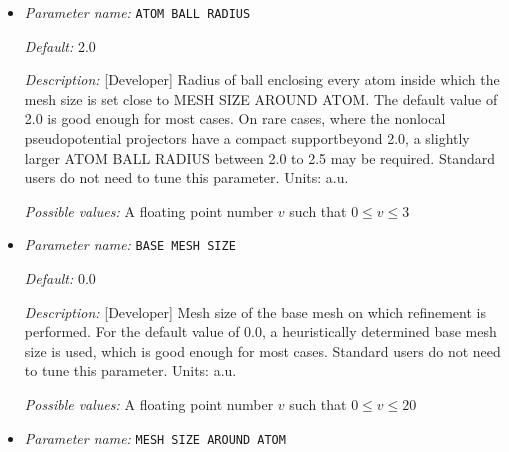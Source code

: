 \begin{itemize}
\item {\it Parameter name:} {\tt ATOM BALL RADIUS}
\label{parameters:Finite element mesh parameters/Auto mesh generation parameters/ATOM BALL RADIUS}
\label{parameters:Finite_20element_20mesh_20parameters/Auto_20mesh_20generation_20parameters/ATOM_20BALL_20RADIUS}




{\it Default:} 2.0


{\it Description:} [Developer] Radius of ball enclosing every atom inside which the mesh size is set close to MESH SIZE AROUND ATOM. The default value of 2.0 is good enough for most cases. On rare cases, where the nonlocal pseudopotential projectors have a compact supportbeyond 2.0, a slightly larger ATOM BALL RADIUS between 2.0 to 2.5 may be required. Standard users do not need to tune this parameter. Units: a.u.


{\it Possible values:} A floating point number $v$ such that $0 \leq v \leq 3$
\item {\it Parameter name:} {\tt BASE MESH SIZE}
\label{parameters:Finite element mesh parameters/Auto mesh generation parameters/BASE MESH SIZE}
\label{parameters:Finite_20element_20mesh_20parameters/Auto_20mesh_20generation_20parameters/BASE_20MESH_20SIZE}




{\it Default:} 0.0


{\it Description:} [Developer] Mesh size of the base mesh on which refinement is performed. For the default value of 0.0, a heuristically determined base mesh size is used, which is good enough for most cases. Standard users do not need to tune this parameter. Units: a.u.


{\it Possible values:} A floating point number $v$ such that $0 \leq v \leq 20$
\item {\it Parameter name:} {\tt MESH SIZE AROUND ATOM}
\label{parameters:Finite element mesh parameters/Auto mesh generation parameters/MESH SIZE AROUND ATOM}
\label{parameters:Finite_20element_20mesh_20parameters/Auto_20mesh_20generation_20parameters/MESH_20SIZE_20AROUND_20ATOM}





\end{itemize}
